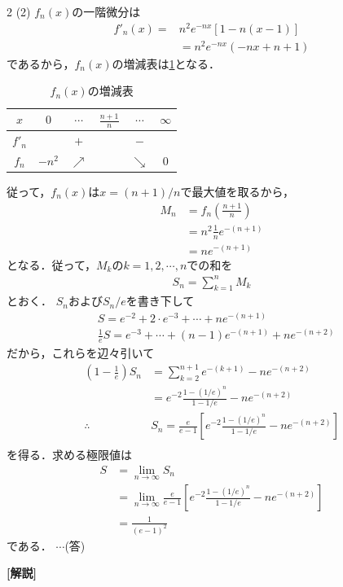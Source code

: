 \documentclass[../../../../main.tex]{subfiles}
\begin{document}
\begin{multicols}{2}
  \vspace{10pt}
  (2)
  $f_n(x)$の一階微分は
  \begin{align*}
    f'_n(x) =
     & n^2e^{-nx}\left[1-n(x-1)\right] \\
     & = n^2e^{-nx}(-nx+n+1)
  \end{align*}
  であるから，$f_n(x)$の増減表は\cref{2000-2:table:1}となる．
  \begin{table}[H]
    \centering
    \caption{$f_n(x)$の増減表}
    \label{2000-2:table:1}
    \begin{tabular}{|c||c|c|c|c|c|}
      \hline
      $x$    & $0$    & $\cdots$   & $\frac{n+1}{n}$ & $\cdots$   & $\infty$ \\
      \hline
      $f'_n$ &        & $+$        &                 & $-$        &          \\
      \hline
      $f_n$  & $-n^2$ & $\nearrow$ &                 & $\searrow$ & $0$      \\
      \hline
    \end{tabular}
  \end{table}
  従って，$f_n(x)$は$x=(n+1)/n$で最大値を取るから，
  \begin{align*}
    M_n
     & = f_n\left(\frac{n+1}{n}\right) \\
     & = n^2 \frac{1}{n} e^{-(n+1)}    \\
     & = n e^{-(n+1)}
  \end{align*}
  となる．従って，$M_k$の$k=1,2,\cdots,n$での和を
  \begin{align*}
    S_n= \sum_{k=1}^{n}M_k
  \end{align*}
  とおく．
  $S_n$および$S_n/e$を書き下して
  \begin{align*}
     & S = e^{-2} + 2 \cdot e^{-3} + \cdots + n e^{-(n+1)}              \\
     & \frac{1}{e}S = e^{-3} + \cdots + (n-1) e^{-(n+1)} + n e^{-(n+2)}
  \end{align*}
  だから，これらを辺々引いて
  \begin{align*}
    \left(1-\frac{1}{e}\right)S_n
     & = \sum_{k=2}^{n+1} e^{-(k+1)} - n e^{-(n+2)}                                     \\
     & = e^{-2} \frac{1-(1/e)^n}{1-1/e} - n e^{-(n+2)}                                  \\
    \therefore
     & S_n = \frac{e}{e-1} \left[ e^{-2} \frac{1-(1/e)^n}{1-1/e} - n e^{-(n+2)} \right] \\
  \end{align*}
  を得る．求める極限値は
  \begin{align*}
    S
     & = \lim_{n\to\infty}S_n                                                                        \\
     & = \lim_{n\to\infty}\frac{e}{e-1} \left[ e^{-2} \frac{1-(1/e)^n}{1-1/e} - n e^{-(n+2)} \right] \\
     & =\frac{1}{(e-1)^2}
  \end{align*}
  である．  $\cdots$(答)

  \vspace{10pt}
  {\bf[解説]}

  \newpage
\end{multicols}
\end{document}
